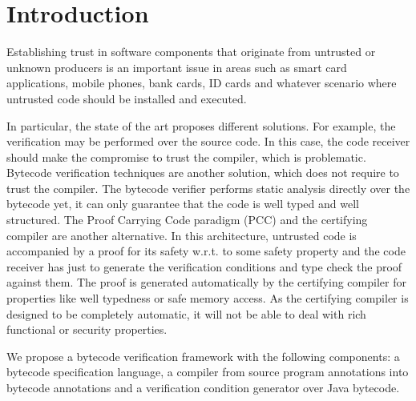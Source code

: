 \section{Introduction}\label{intro}
Establishing trust in software components that originate from untrusted or unknown producers is an important issue in areas such as
 smart card applications, mobile phones, bank cards, ID cards and whatever scenario where untrusted code should be installed and executed.

In particular, the state of the art proposes different solutions. For example,
 the verification may be performed over the source code. In this case, the code receiver should make the compromise to trust the compiler, which is problematic. Bytecode verification techniques \cite{Ljbc} are another solution, which does not require to trust the compiler. 
The bytecode verifier performs static analysis directly over the bytecode yet, it can only guarantee that 
the code is well typed and well structured. %
The Proof Carrying Code paradigm (PCC) and the certifying compiler \cite{DesNecLee98} are another alternative.
 In this architecture, untrusted code
is accompanied by a proof for its safety w.r.t. to some safety property and the code receiver has just to generate the 
verification conditions and type check the proof against them. 
The proof is generated automatically by the certifying compiler for properties like well typedness or safe memory access. 
As the certifying compiler is designed to be completely automatic, it will not be able to deal with rich functional or security properties. 
 
We propose a bytecode verification framework with the following components: a bytecode specification language, a compiler from source
 program annotations into bytecode annotations and a verification condition generator over Java bytecode.
%  


